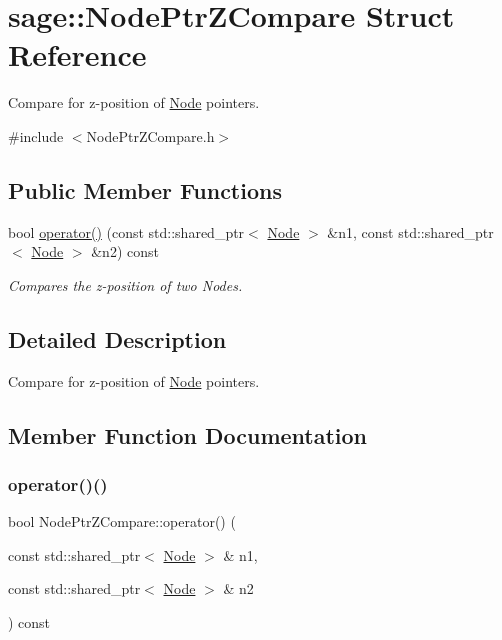 \hypertarget{structsage_1_1NodePtrZCompare}{}\section{sage\+::Node\+Ptr\+Z\+Compare Struct Reference}
\label{structsage_1_1NodePtrZCompare}


Compare for z-\/position of \mbox{\hyperlink{classsage_1_1Node}{Node}} pointers.  




{\ttfamily \#include $<$Node\+Ptr\+Z\+Compare.\+h$>$}

\subsection*{Public Member Functions}
\begin{DoxyCompactItemize}
\item 
bool \mbox{\hyperlink{structsage_1_1NodePtrZCompare_a1241650c04a8d27fae228a7a43f35f30}{operator()}} (const std\+::shared\+\_\+ptr$<$ \mbox{\hyperlink{classsage_1_1Node}{Node}} $>$ \&n1, const std\+::shared\+\_\+ptr$<$ \mbox{\hyperlink{classsage_1_1Node}{Node}} $>$ \&n2) const
\begin{DoxyCompactList}\small\item\em Compares the z-\/position of two Nodes. \end{DoxyCompactList}\end{DoxyCompactItemize}


\subsection{Detailed Description}
Compare for z-\/position of \mbox{\hyperlink{classsage_1_1Node}{Node}} pointers. 

\subsection{Member Function Documentation}
\mbox{\label{structsage_1_1NodePtrZCompare_a1241650c04a8d27fae228a7a43f35f30}} 
\subsubsection{\texorpdfstring{operator()()}{operator()()}}
{\footnotesize\ttfamily bool Node\+Ptr\+Z\+Compare\+::operator() (\begin{DoxyParamCaption}\item[{const std\+::shared\+\_\+ptr$<$ \mbox{\hyperlink{classsage_1_1Node}{Node}} $>$ \&}]{n1,  }\item[{const std\+::shared\+\_\+ptr$<$ \mbox{\hyperlink{classsage_1_1Node}{Node}} $>$ \&}]{n2 }\end{DoxyParamCaption}) const}



